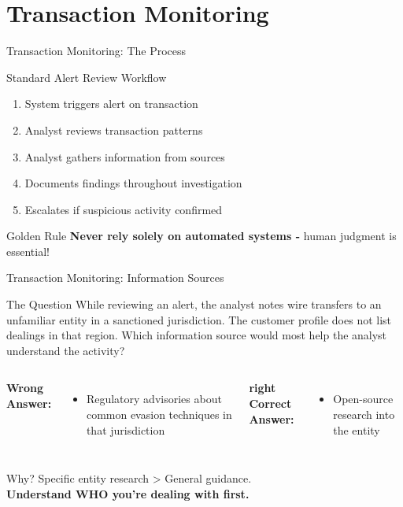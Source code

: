 \documentclass{beamer}
\begin{document}
\section{Transaction Monitoring}
\begin{frame}{Transaction Monitoring: The Process}
\begin{block}{Standard Alert Review Workflow}
\begin{enumerate}
    \item System triggers alert on transaction
    \item Analyst reviews transaction patterns
    \item Analyst gathers information from sources
    \item Documents findings throughout investigation
    \item Escalates if suspicious activity confirmed
\end{enumerate}
\end{block}
\begin{alertblock}{Golden Rule}
\textbf{Never rely solely on automated systems -} human judgment is essential!
\end{alertblock}
\end{frame}

\begin{frame}{Transaction Monitoring: Information Sources}
\begin{block}{The Question}
\small{While reviewing an alert, the analyst notes wire transfers to an unfamiliar entity in a sanctioned jurisdiction. The customer profile does not list dealings in that region. Which information source would most help the analyst understand the activity?}
\end{block}

\vspace{0.3cm}
\begin{columns}
\textcolor{wrong}{\textbf{Wrong Answer:}}
\begin{itemize}
    \item Regulatory advisories about common evasion techniques in that jurisdiction
\end{itemize}

\textcolor{correct}{\textbf{right Correct Answer:}}
\begin{itemize}
    \item Open-source research into the entity
\end{itemize}
\end{columns}

\vspace{0.3cm}
\begin{block}{Why?}
Specific entity research \textgreater{} General guidance. \\
\textbf{Understand WHO you're dealing with first.}
\end{block}
\end{frame}
\end{document}
